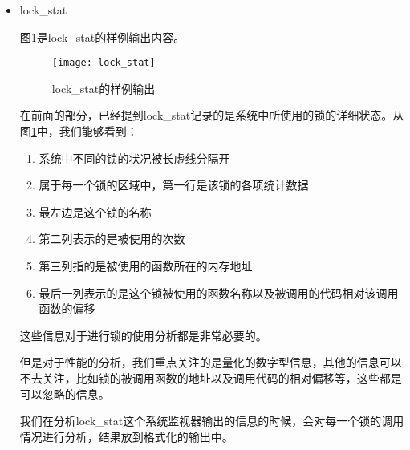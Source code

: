 \begin{itemize}
下面使buddyinfo系统监视器的样例输出内容：
{\footnotesize
\begin{verbatim}
time: 1361881488
Node 0, zone      DMA      0      0      0      1      2      1      1      0      1      1      3   
Node 0, zone    DMA32      8      4      6      7      4      3      5      8      7      3    738 
Node 0, zone   Normal    172    118     51     41     11      3      1      7      1      1      4   
Node 1, zone   Normal     61     66     24      4      0      1      1      9     11      5    922 
time: 1361881489
Node 0, zone      DMA      0      0      0      1      2      1      1      0      1      1      3   
Node 0, zone    DMA32      8      4      6      7      4      3      5      8      7      3    738 
Node 0, zone   Normal    172    118     51     41     11      3      1      7      1      1      4   
Node 1, zone   Normal     99     65     26      5      1      1      1      9     11      5    922 
\end{verbatim}
}
在查询了相关的资料\cite{buddyinfo}之后，我们知道DMA，DMA32等指的是内存的类型，后面的数字指的是buddy算法中不同大小的块的个数。

比如，对于上面输出的第三行，对于DMA32，系统中有8个$2^0*$PAGE\_SIZE大小的块，4个$2^1*$PAGE\_SIZE大小的块，6个$2^2*$PAGE\_SIZE大小的块……

因此，通过buddyinfo这个系统监视器，我们可以很轻易地知道系统中buddy内存分配算法的运行状况。
\item lock\_stat

图\ref{fig:lock_stat}是lock\_stat的样例输出内容。

\begin{figure}[H]
\centering
\texttt{[image: lock\_stat]}
\caption{lock\_stat的样例输出}
\label{fig:lock_stat}
\end{figure}

在前面的部分，已经提到lock\_stat记录的是系统中所使用的锁的详细状态。从图\ref{fig:lock_stat}中，我们能够看到：
\begin{enumerate}
\item 系统中不同的锁的状况被长虚线分隔开
\item 属于每一个锁的区域中，第一行是该锁的各项统计数据
\item 最左边是这个锁的名称
\item 第二列表示的是被使用的次数
\item 第三列指的是被使用的函数所在的内存地址
\item 最后一列表示的是这个锁被使用的函数名称以及被调用的代码相对该调用函数的偏移
\end{enumerate}
这些信息对于进行锁的使用分析都是非常必要的。

但是对于性能的分析，我们重点关注的是量化的数字型信息，其他的信息可以不去关注，比如锁的被调用函数的地址以及调用代码的相对偏移等，这些都是可以忽略的信息。

我们在分析lock\_stat这个系统监视器输出的信息的时候，会对每一个锁的调用情况进行分析，结果放到格式化的输出中。

\end{itemize}

